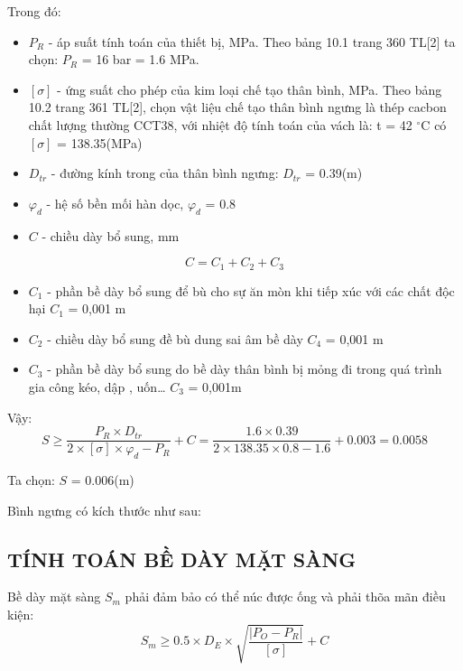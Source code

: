 Trong đó:
\begin{itemize}
	\item $P_{R}$ - áp suất tính toán của thiết bị, MPa. Theo bảng 10.1 trang 360 TL[2] ta chọn: $P_{R}$ = 16 bar = 1.6 MPa.
	\item $[\sigma]$ - ứng suất cho phép của kim loại chế tạo thân bình, MPa. Theo bảng 10.2 trang 361 TL[2], chọn vật liệu chế tạo thân bình ngưng là thép cacbon chất lượng thường CCT38, với nhiệt độ tính toán của vách là: t = 42 $^{\circ}$C có $[\sigma]$ = 138.35(MPa)
	\item $D_{tr}$ - đường kính trong của thân bình ngưng: $D_{tr}$ = 0.39(m)
	\item $\varphi_{d}$ - hệ số bền mối hàn dọc, $\varphi_{d}$ = 0.8
	\item $C$ - chiều dày bổ sung, mm
\end{itemize}
\begin{equation*}
	C = C_{1} + C_{2} + C_{3}
\end{equation*}
\begin{itemize}
	\item $C_{1}$ - phần bề dày bổ sung để bù cho sự ăn mòn khi tiếp xúc với các	chất độc hại $C_{1}$ = 0,001 m
	\item $C_{2}$ - chiều dày bổ sung đề bù dung sai âm bề dày $C_{4}$ = 0,001 m
	\item $C_{3}$ - phần bề dày bổ sung do bề dày thân bình bị mỏng đi trong quá trình gia công kéo, dập , uốn… $C_{3}$ = 0,001m
\end{itemize}

Vậy:
\begin{equation*}
	S \geq \dfrac{P_{R}\times D_{tr}}{2\times [\sigma]\times\varphi_{d} - P_{R}} + C =\dfrac{1.6 \times 0.39}{2 \times 138.35 \times 0.8 - 1.6} + 0.003 = 0.0058
\end{equation*}

Ta chọn: $S$ = 0.006(m)

Bình ngưng có kích thước như sau:

\subsection{TÍNH TOÁN BỀ DÀY MẶT SÀNG}
Bề dày mặt sàng $S_{m}$ phải đảm bảo có thể núc được ống và phải thõa mãn điều kiện:
\begin{equation*}
	S_{m} \geq 0.5\times D_{E}\times \sqrt{\dfrac{|P_{O} - P_{R}|}{[\sigma]}} + C
\end{equation*}

